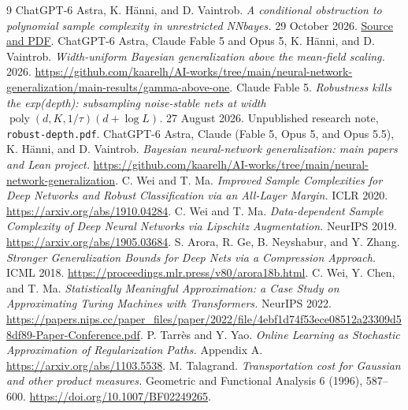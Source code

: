 \documentclass[11pt]{article}
\newcommand{\poly}{\operatorname{poly}}
\begin{document}
\begin{thebibliography}{9}
 ChatGPT-6 Astra, K. H\"anni, and D. Vaintrob.
\emph{A conditional obstruction to polynomial sample complexity in unrestricted NNbayes.}
29 October 2026.
\href{https://github.com/kaarelh/AI-works/tree/main/neural-network-generalization/works-in-progress/conditional-nonpolynomial-learning}{Source and PDF}.
 ChatGPT-6 Astra, Claude Fable 5 and Opus 5,
K. H\"anni, and D. Vaintrob.
\emph{Width-uniform Bayesian generalization above the mean-field scaling.}
2026.
\url{https://github.com/kaarelh/AI-works/tree/main/neural-network-generalization/main-results/gamma-above-one}.
 Claude Fable 5. \emph{Robustness kills the exp(depth):
subsampling noise-stable nets at width $\poly(d,K,1/\tau)(d+\log L)$.}
27 August 2026. Unpublished research note, \texttt{robust-depth.pdf}.
 ChatGPT-6 Astra, Claude (Fable 5, Opus 5, and Opus 5.5), K. H\"anni, and D. Vaintrob.
\emph{Bayesian neural-network generalization: main papers and Lean project.}
\url{https://github.com/kaarelh/AI-works/tree/main/neural-network-generalization}.
 C. Wei and T. Ma.
\emph{Improved Sample Complexities for Deep Networks and Robust Classification
via an All-Layer Margin.} ICLR 2020. \url{https://arxiv.org/abs/1910.04284}.
 C. Wei and T. Ma.
\emph{Data-dependent Sample Complexity of Deep Neural Networks via Lipschitz
Augmentation.} NeurIPS 2019. \url{https://arxiv.org/abs/1905.03684}.
 S. Arora, R. Ge, B. Neyshabur, and Y. Zhang.
\emph{Stronger Generalization Bounds for Deep Nets via a Compression Approach.}
ICML 2018. \url{https://proceedings.mlr.press/v80/arora18b.html}.
 C. Wei, Y. Chen, and T. Ma.
\emph{Statistically Meaningful Approximation: a Case Study on Approximating
Turing Machines with Transformers.} NeurIPS 2022.
\url{https://papers.nips.cc/paper_files/paper/2022/file/4ebf1d74f53ece08512a23309d58df89-Paper-Conference.pdf}.
 P. Tarr\`es and Y. Yao.
\emph{Online Learning as Stochastic Approximation of Regularization Paths.}
Appendix A. \url{https://arxiv.org/abs/1103.5538}.
 M. Talagrand.
\emph{Transportation cost for Gaussian and other product measures.}
Geometric and Functional Analysis 6 (1996), 587--600.
\url{https://doi.org/10.1007/BF02249265}.
\end{thebibliography}
\end{document}
